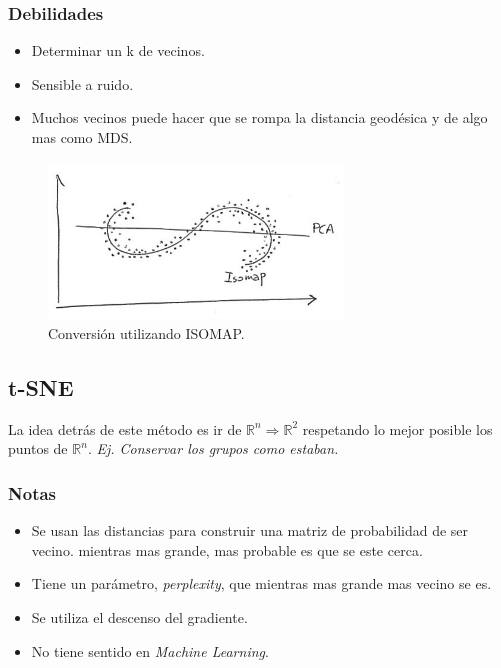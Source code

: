 \documentclass[titlepage,a4paper]{article}
\begin{document}
\subsubsection*{Debilidades}
\begin{itemize}
    \item Determinar un k de vecinos.
    \item Sensible a ruido.
    \item Muchos vecinos puede hacer que se rompa la distancia geodésica y de algo mas como MDS.
\end{itemize}

\begin{figure}[!htb]
    \centering
    \includegraphics[width=0.7\textwidth]{imagenesResumen/ISOMAP.jpeg}
    \caption{Conversión utilizando ISOMAP.}
\end{figure}

\newpage

\subsection{t-SNE}

La idea detrás de este método es ir de $\mathbb{R}^{n} \Rightarrow \mathbb{R}^{2}$ respetando lo mejor posible los puntos de $\mathbb{R}^{n}$. \textit{Ej. Conservar los grupos como estaban.}

\subsubsection*{Notas}
\begin{itemize}
    \item Se usan las distancias para construir una matriz de probabilidad de ser vecino. mientras mas grande, mas probable es que se este cerca.

    \item Tiene un parámetro, \textit{perplexity}, que mientras mas grande mas vecino se es.
    
    \item Se utiliza el descenso del gradiente.
    
    \item No tiene sentido en \textit{Machine Learning}.
\end{itemize}
\end{document}
